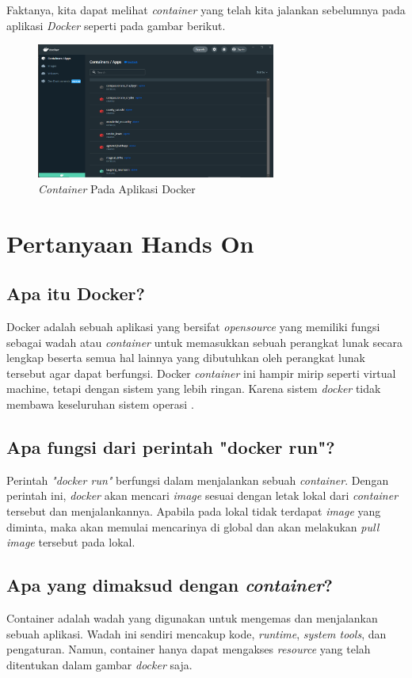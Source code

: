 \documentclass[11pt,a4paper]{article}
\begin{document}
    Faktanya, kita dapat melihat \textit{container} yang telah kita jalankan sebelumnya pada aplikasi \textit{Docker} seperti pada 
    gambar berikut.
    \begin{figure}[h]
        \centering
        \includegraphics[width = 0.7\textwidth]{Figures/tampilan container.png}
        \caption{\textit{Container} Pada Aplikasi Docker}
    \end{figure}

\section{Pertanyaan Hands On}
\subsection{Apa itu Docker?}
    Docker adalah sebuah aplikasi yang bersifat \textit{opensource} yang memiliki fungsi sebagai wadah atau \textit{container} untuk memasukkan sebuah perangkat lunak 
    secara lengkap beserta semua hal lainnya yang dibutuhkan oleh perangkat lunak tersebut agar dapat berfungsi. Docker \textit{container} ini hampir mirip seperti virtual machine, 
    tetapi dengan sistem yang lebih ringan. Karena sistem \textit{docker} tidak membawa keseluruhan sistem operasi \cite{goasguen_2015}.

\subsection{Apa fungsi dari perintah "docker run"?}
    Perintah \textit{"docker run"} berfungsi dalam menjalankan sebuah \textit{container}. Dengan perintah ini, \textit{docker} akan mencari \textit{image} sesuai dengan letak lokal dari 
    \textit{container} tersebut dan menjalankannya. Apabila pada lokal tidak terdapat \textit{image} yang diminta, maka akan memulai mencarinya di global dan akan melakukan \textit{pull image} 
    tersebut pada lokal. 

\subsection{Apa yang dimaksud dengan \textit{container}?}
    Container adalah wadah yang digunakan untuk mengemas dan menjalankan sebuah aplikasi. Wadah ini sendiri mencakup kode, \textit{runtime}, \textit{system tools}, dan pengaturan. Namun, container hanya dapat 
    mengakses \textit{resource} yang telah ditentukan dalam gambar \textit{docker} saja.
\end{document}
